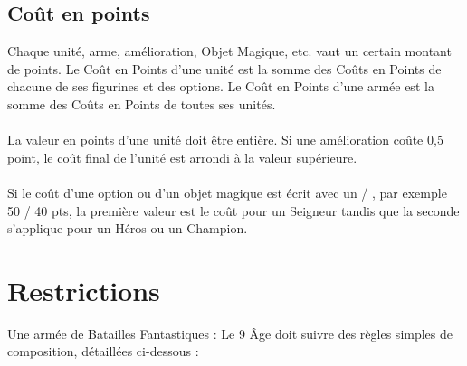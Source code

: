 \subsection{Coût en points}

Chaque unité, arme, amélioration, Objet Magique, etc. vaut un certain montant de points. Le Coût en Points d'une unité est la somme des Coûts en Points de chacune de ses figurines et des options. Le Coût en Points d'une armée est la somme des Coûts en Points de toutes ses unités.

\paragraph{}

La valeur en points d'une unité doit être entière. Si une amélioration coûte 0,5 point, le coût final de l'unité est arrondi à la valeur supérieure.

\paragraph{}

Si le coût d'une option ou d'un objet magique est écrit avec un \og / \fg{}, par exemple 50 / 40 pts, la première valeur est le coût pour un Seigneur tandis que la seconde s'applique pour un Héros ou un Champion.

\section{Restrictions}

Une armée de Batailles Fantastiques : Le 9\ieme{} Âge doit suivre des règles simples de composition, détaillées ci-dessous :

